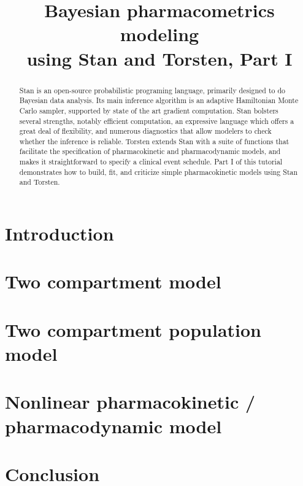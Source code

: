 \documentclass[11pt]{article}
\title{Bayesian pharmacometrics modeling \\ using Stan and Torsten, Part I}
\author{}
\date{}
\begin{document}
\maketitle

\begin{abstract}
  Stan is an open-source probabilistic programing language, primarily designed to do Bayesian data analysis.
  Its main inference algorithm is an adaptive Hamiltonian Monte Carlo sampler, supported by state of the art gradient computation.
  Stan bolsters several strengths, notably efficient computation, an expressive language which offers a great deal of flexibility, and numerous diagnostics that allow modelers to check whether the inference is reliable.
  Torsten extends Stan with a suite of functions that facilitate the specification of pharmacokinetic and pharmacodynamic models, and makes it straightforward to specify a clinical event schedule.
  Part I of this tutorial demonstrates how to build, fit, and criticize simple pharmacokinetic models using Stan and Torsten.
\end{abstract}

\section{Introduction}


%

\section{Two compartment model}  \label{sec:twoCpt}


\section{Two compartment population model}


\section{Nonlinear pharmacokinetic / pharmacodynamic model}


\section{Conclusion}




\end{document}
